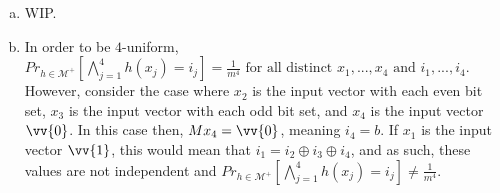\documentclass[11pt]{article}
\begin{document}
\begin{enumerate}[(a)]
\item
\begin{solution}
    WIP.
\end{solution}

\item
\begin{solution}

\end{solution}
        In order to be $4$-uniform, $Pr_{h \in \mathcal{M}^+}[\bigwedge_{j=1}^{4} h(x_j) = i_j] = \frac{1}{m^4} \text{ for all distinct } x_1,...,x_4 \text{ and } i_1,...,i_4$. However, consider the case where $x_2$ is the input vector with each even bit set, $x_3$ is the input vector with each odd bit set, and $x_4$ is the input vector $\vv{0}$. In this case then, $Mx_4 = \vv{0}$, meaning $i_4 = b$. If $x_1$ is the input vector $\vv{1}$, this would mean that $i_1 = i_2 \oplus i_3 \oplus i_4$, and as such, these values are not independent and $Pr_{h \in \mathcal{M}^+}[\bigwedge_{j=1}^{4} h(x_j) = i_j] \neq \frac{1}{m^4}$.
\end{enumerate}

\clearpage
\end{document}
